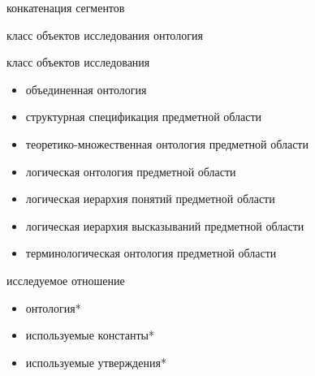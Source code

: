 \begin{SCn}
\scnsectionheader{\currentname}
\begin{scnsubstruct}
\begin{scnreltovector}{конкатенация сегментов}
\end{scnreltovector}
\begin{scnhaselementrole}{класс объектов исследования}
онтология\end{scnhaselementrole}
\begin{scnhaselementrolelist}{класс объектов исследования}
\begin{itemize}
  \item объединенная онтология
  \item структурная спецификация предметной области
  \item теоретико-множественная онтология предметной области
  \item логическая онтология предметной области
  \item логическая иерархия понятий предметной области
  \item логическая иерархия высказываний предметной области
  \item терминологическая онтология предметной области
\end{itemize}
\end{scnhaselementrolelist}
\begin{scnhaselementrolelist}{исследуемое отношение}
\begin{itemize}
  \item онтология*
  \item используемые константы*
  \item используемые утверждения*
\end{itemize}
\end{scnhaselementrolelist}
\end{scnsubstruct}
\begin{scnsubstruct}

\end{scnsubstruct}
\end{SCn}

